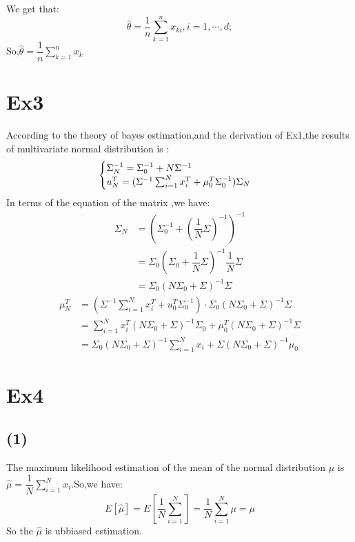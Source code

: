 \documentclass[10pt,a4paper]{article}
\begin{document}
	We get that:
	\begin{equation*}
	\hat{\theta}=\dfrac{1}{n}\sum_{k=1}^{n}x_{ki},i=1,\cdots,d;
	\end{equation*}
	So,$\hat{\theta}=\dfrac{1}{n}\sum_{k=1}^{n}x_k$
	\section{Ex3}
	According to the theory of bayes estimation,and the derivation of Ex1,the results of multivariate normal distribution is :
    \begin{eqnarray}
    \begin{cases}
    \Sigma_N^{-1}=\Sigma_{0}^{-1}+N\Sigma^{-1}\cr u_N^{T}=(\Sigma^{-1}\sum_{i=1}^{N}x_i^{T}+\mu_0^{T}\Sigma_0^{-1})\Sigma_N
    \end{cases}
    \end{eqnarray}
    In terms of the equation of the matrix ,we have:
    \begin{equation*}
    \begin{split}
    \Sigma_N &=(\Sigma_0^{-1}+(\dfrac{1}{N}\Sigma)^{-1})^{-1}\\
    &=\Sigma_0(\Sigma_0+\dfrac{1}{N}\Sigma)^{-1}\dfrac{1}{N}\Sigma\\
    &=\Sigma_0(N\Sigma_0+\Sigma)^{-1}\Sigma
    \end{split}
    \end{equation*} 
    \begin{equation*}
    \begin{split} 
    \mu_{N}^{T}&=(\Sigma^{-1}\sum_{i=1}^{N}x_i^T+u_0^T\Sigma_0^{-1})\cdot \Sigma_0(N\Sigma_0+\Sigma)^{-1}\Sigma\\
    &=\sum_{i=1}^{N}x_i^T(N\Sigma_0+\Sigma)^{-1}\Sigma_0+\mu_0^T(N\Sigma_0+\Sigma)^{-1}\Sigma\\
    &=\Sigma_0(N\Sigma_0+\Sigma)^{-1}\sum_{i=1}^{N}x_i+\Sigma(N\Sigma_0+\Sigma)^{-1}\mu_0
    \end{split}
    \end{equation*}
\section{Ex4}
\subsection{(1)}
The maximum likelihood estimation of the mean of the normal distribution $\mu$ is $\hat{\mu}=\dfrac{1}{N}\sum_{i=1}^{N}x_i$.So,we have:
\begin{equation*}
    E[\hat{\mu}]=E[\dfrac{1}{N}\sum_{i=1}^{N}]=\dfrac{1}{N}\sum_{i=1}^{N}\mu =\mu
\end{equation*}
So the $\hat{\mu}$ is ubbiased estimation.
\end{document}
